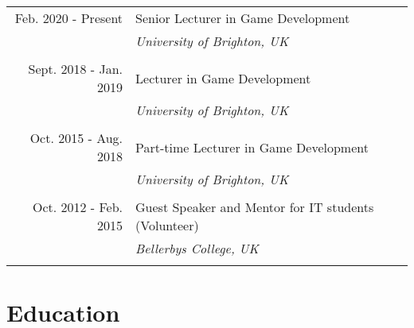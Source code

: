 \documentclass[a4paper,11pt]{article} %
\begin{document}
\begin{tabular}{r|p{11cm}}

Feb. 2020 - Present & Senior Lecturer in Game Development\\
& \emph{University of Brighton, UK}\\
\multicolumn{2}{c}{} \\


Sept. 2018 - Jan. 2019 & Lecturer in Game Development\\
& \emph{University of Brighton, UK}\\
\multicolumn{2}{c}{} \\


Oct. 2015 - Aug. 2018 & Part-time Lecturer in Game Development\\
& \emph{University of Brighton, UK}\\
\multicolumn{2}{c}{} \\


Oct. 2012 - Feb. 2015 & Guest Speaker and Mentor for IT students (Volunteer)\\
& \emph{Bellerbys College, UK}\\
\multicolumn{2}{c}{} \\

\end{tabular}


\section{Education}
\end{document}
